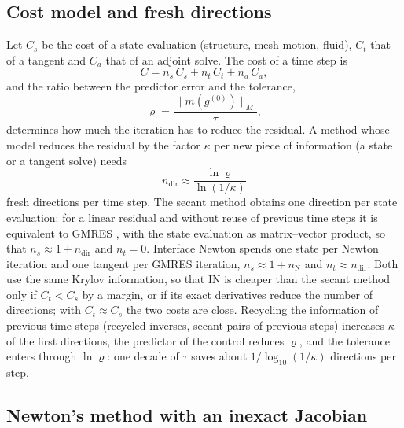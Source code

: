 \documentclass[11pt,a4paper]{article}
\theoremstyle{definition}
\theoremstyle{remark}
\newcommand{\M}{M}
\begin{document}
\subsection{Cost model and fresh directions}\label{sec:cost_model}

Let $C_s$ be the cost of a state evaluation (structure, mesh motion, fluid), $C_t$ that of a
tangent and $C_a$ that of an adjoint solve. The cost of a time step is
\begin{equation}\label{eq:cost}
  C=n_s\,C_s+n_t\,C_t+n_a\,C_a ,
\end{equation}
and the ratio between the predictor error and the tolerance,
\begin{equation}\label{eq:rho}
  \varrho=\frac{\|m(g^{(0)})\|_{\M}}{\tau},
\end{equation}
determines how much the iteration has to reduce the residual. A method whose model reduces the
residual by the factor $\kappa$ per new piece of information (a state or a tangent solve) needs
\begin{equation}\label{eq:directions}
  n_{\mathrm{dir}}\approx\frac{\ln\varrho}{\ln(1/\kappa)}
\end{equation}
fresh directions per time step. The secant method obtains one direction per state evaluation: for
a linear residual and without reuse of previous time steps it is equivalent to GMRES
\cite{WalkerNi2011}, with the state evaluation as matrix--vector product, so that
$n_s\approx1+n_{\mathrm{dir}}$ and $n_t=0$. Interface Newton spends one state per Newton iteration
and one tangent per GMRES iteration, $n_s\approx1+n_{\mathrm N}$ and $n_t\approx n_{\mathrm{dir}}$.
Both use the same Krylov information, so that IN is cheaper than the secant method only if
$C_t<C_s$ by a margin, or if its exact derivatives reduce the number of directions; with
$C_t\approx C_s$ the two costs are close. Recycling the information of previous time steps
(recycled inverses, secant pairs of previous steps) increases $\kappa$ of the first directions,
the predictor of the control reduces $\varrho$, and the tolerance enters through
$\ln\varrho$: one decade of $\tau$ saves about $1/\log_{10}(1/\kappa)$ directions per step.

\subsection{Newton's method with an inexact Jacobian}\label{sec:newton_error}
\end{document}
